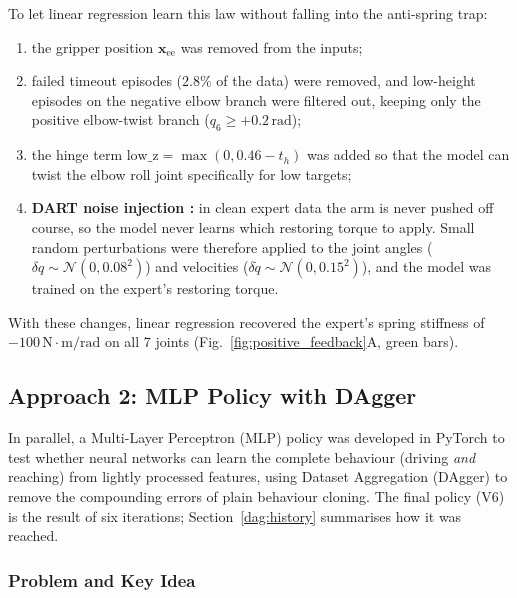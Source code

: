 \documentclass[conference]{IEEEtran}
\begin{document}
To let linear regression learn this law without falling into the anti-spring trap:
\begin{enumerate}
    \item the gripper position $\mathbf{x}_{\text{ee}}$ was removed from the inputs;
    \item failed timeout episodes ($2.8\%$ of the data) were removed, and low-height episodes on the negative elbow branch were filtered out, keeping only the positive elbow-twist branch ($q_6 \ge +0.2\,\text{rad}$);
    \item the hinge term $\text{low\_z} = \max(0, 0.46 - t_h)$ was added so that the model can twist the elbow roll joint specifically for low targets;
    \item \textbf{DART noise injection \cite{laskey2017dart}:} in clean expert data the arm is never pushed off course, so the model never learns which restoring torque to apply. Small random perturbations were therefore applied to the joint angles ($\delta q \sim \mathcal{N}(0, 0.08^2)$) and velocities ($\delta \dot{q} \sim \mathcal{N}(0, 0.15^2)$), and the model was trained on the expert's restoring torque.
\end{enumerate}
With these changes, linear regression recovered the expert's spring stiffness of $-100\,\text{N}\cdot\text{m/rad}$ on all 7 joints (Fig.~\ref{fig:positive_feedback}A, green bars).

\subsection{Approach 2: MLP Policy with DAgger}
\label{dag:sec}

In parallel, a Multi-Layer Perceptron (MLP) policy was developed in PyTorch to test whether neural networks can learn the complete behaviour (driving \emph{and} reaching) from lightly processed features, using Dataset Aggregation (DAgger) \cite{ross2011reduction} to remove the compounding errors of plain behaviour cloning. The final policy (V6) is the result of six iterations; Section~\ref{dag:history} summarises how it was reached.

\subsubsection{Problem and Key Idea}
\label{dag:problem}
\end{document}
